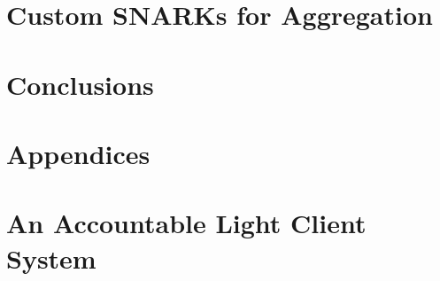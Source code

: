 \documentclass[runningheads]{llncs}
\begin{document}
\vspace{-0.5cm}
\section{Custom SNARKs for Aggregation } \label{sec_apk_proofs}


\vspace{-0.7cm}
\section{Conclusions}\label{conclusions}


%

%
%



\onecolumn
\appendix
\section*{Appendices}










\section{An Accountable Light Client System} \label{sec_light_client_model}




%

\end{document}
